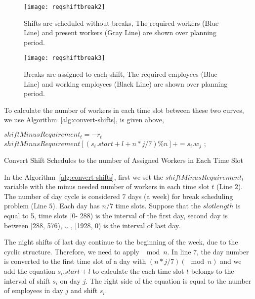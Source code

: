 \begin{itemize}
\begin{figure}[h]
  \centering
  \texttt{[image: reqshiftbreak2]}
  \caption{Shifts are scheduled without breaks, The required workers (Blue Line) and present workers (Gray Line) are shown over planning period.}
  \label{fig:reqshiftbreak2} 
\end{figure}

\begin{figure}[h]
  \centering
  \texttt{[image: reqshiftbreak3]}
  \caption{ Breaks are assigned to each shift, The required employees (Blue Line) and working employees (Black Line) are shown over planning period.}
  \label{fig:reqshiftbreak3} 
\end{figure}


To calculate the number of workers in each time slot between these two curves, we use Algorithm~\ref{alg:convert-shifts}, is given above,

\begin{algorithm}
  {
    $shiftMinusRequirement_t = -  r_t$
  }
  {
     {
        {
		 $shiftMinusRequirement[(s_i.start + l + n * j/7) \%n] += s_i.w_j$  ;
        }
     }
  }
  \caption{Convert Shift Schedules to the number of Assigned Workers in Each Time Slot}
  \label{alg:convert-shifts} 
\end{algorithm}


In the Algorithm~\ref{alg:convert-shifts}, first we set the $shiftMinusRequirement_t$ variable with the minus needed number of workers in each time slot $t$ (Line $2$).  The number of day cycle is considered $7$ days (a week) for break scheduling problem (Line $5$). Each day has $n/7$ time slots. Suppose that the $slotlength$ is equal to 5, time slots [0- 288) is the interval of the first day, second day is between [288, 576), .. , [1928, 0) is the interval of last day. 

The night shifts of last day continue to the beginning of the week, due to the cyclic structure. Therefore, we need to apply $\mod n$. In line $7$, the day number is converted to the first time slot of a day with $(n * j / 7) (\mod n)$ and we add the equation $s_i.start + l$  to calculate the each time slot $t$ belongs to the interval of shift $s_i$ on day $j$. The right side of the equation is equal to the number of employees in day $j$ and shift $s_i$. \\


\end{itemize}
